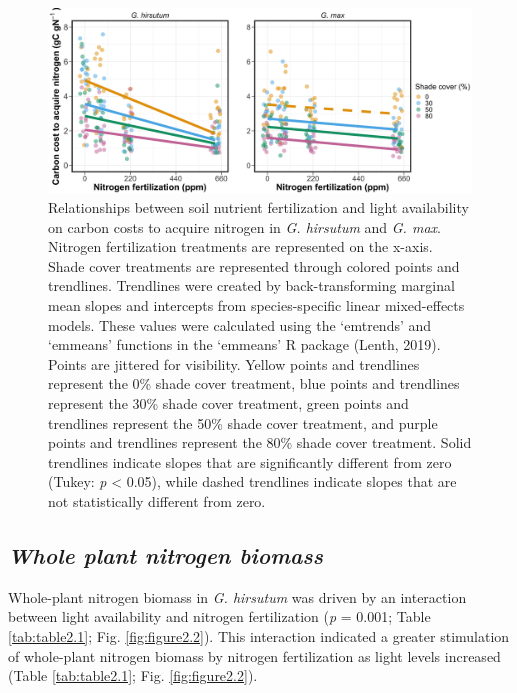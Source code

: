 \clearpage

\newpage
\begin{figure}
    \includegraphics[width=\textwidth]{ch2_LxN_Greenhouse/figs/fig1_ncost.png}
    \centering
    \caption[Relationships between soil nitrogen fertilization and light availability on carbon costs to acquire nitrogen in \textit{G. hirsutum} and \textit{G. max}]{Relationships between soil nutrient fertilization and light availability on carbon costs to acquire nitrogen in \textit{G. hirsutum} and \textit{G. max}. Nitrogen fertilization treatments are represented on the x-axis. Shade cover treatments are represented through colored points and trendlines. Trendlines were created by back-transforming marginal mean slopes and intercepts from species-specific linear mixed-effects models. These values were calculated using the ‘emtrends’ and ‘emmeans’ functions in the ‘emmeans’ R package (Lenth, 2019). Points are jittered for visibility. Yellow points and trendlines represent the 0\% shade cover treatment, blue points and trendlines represent the 30\% shade cover treatment, green points and trendlines represent the 50\% shade cover treatment, and purple points and trendlines represent the 80\% shade cover treatment. Solid trendlines indicate slopes that are significantly different from zero (Tukey: \textit{p} < 0.05), while dashed trendlines indicate slopes that are not statistically different from zero.}
    \label{fig:figure2.1}
\end{figure}
\clearpage


\newpage
\subsection{\textit{Whole plant nitrogen biomass}}
Whole-plant nitrogen biomass in \textit{G. hirsutum} was driven by an interaction between light availability and nitrogen fertilization (\textit{p} = 0.001; Table \ref{tab:table2.1}; Fig. \ref{fig:figure2.2}). This interaction indicated a greater stimulation of whole-plant nitrogen biomass by nitrogen fertilization as light levels increased (Table \ref{tab:table2.1}; Fig. \ref{fig:figure2.2}).


